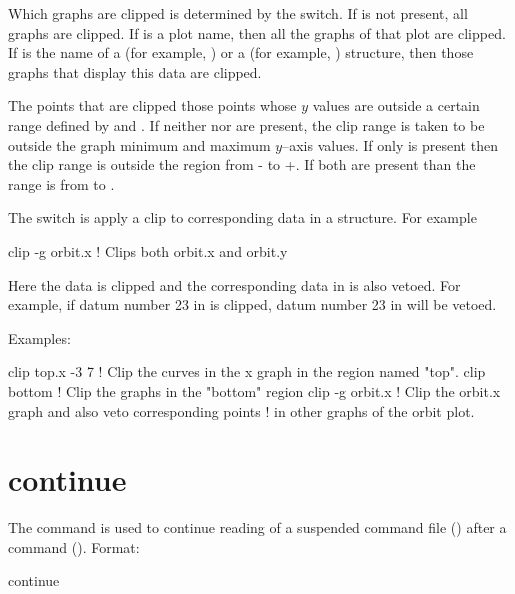 \vskip 10pt Which graphs are clipped is determined by the  switch. If  is
not present, all graphs are clipped. If  is a plot name, then all the graphs of that plot
are clipped. If  is the name of a  (for example, ) or a 
(for example, ) structure, then those graphs that display this data are clipped.

The points that are clipped those points whose $y$ values are outside a certain range defined by
 and . If neither  nor  are present, the clip
range is taken to be outside the graph minimum and maximum $y$--axis values. If only 
is present then the clip range is outside the region from - to +. If both
are present than the range is from  to .

The  switch is apply a clip to corresponding data in a  structure. For example
\begin{example}
  clip -g orbit.x   ! Clips both orbit.x and orbit.y 
\end{example}
Here the  data is clipped and the corresponding data in  is also vetoed. For
example, if datum number 23 in  is clipped, datum number 23 in  will be
vetoed.

Examples:
\begin{example}
  clip top.x -3  7  ! Clip the curves in the x graph in the region named "top".
  clip bottom       ! Clip the graphs in the "bottom" region
  clip -g orbit.x   ! Clip the orbit.x graph and also veto corresponding points
                    ! in other graphs of the orbit plot.
\end{example}

\section{continue}
\label{s:continue}

The  command is used to continue reading of a suspended command file
() after a  command (). Format:
\begin{example}
  continue
\end{example}

